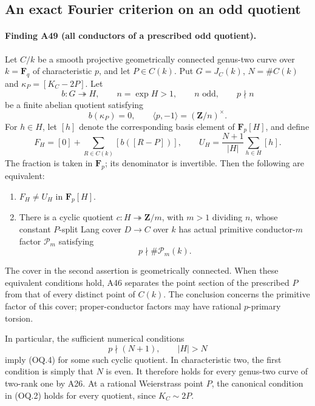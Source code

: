 \subsection{An exact Fourier criterion on an odd quotient}
\label{sec:odd-quotient-fourier}

\paragraph{Finding A49 (all conductors of a prescribed odd quotient).}
Let $C/k$ be a smooth projective geometrically connected genus-two
curve over $k=\mathbf F_q$ of characteristic $p$, and let $P\in C(k)$.
Put $G=J_C(k)$, $N=\#C(k)$ and $\kappa_P=[K_C-2P]$.
Let
\[
 b:G\twoheadrightarrow H,\qquad
 n=\exp H>1,\qquad n\text{ odd},\qquad p\nmid n
 \tag{OQ.1}
\]
be a finite abelian quotient satisfying
\[
 b(\kappa_P)=0,\qquad
       \langle p,-1\rangle=(\mathbf Z/n)^\times.
 \tag{OQ.2}
\]
For $h\in H$, let $[h]$ denote the corresponding basis element of
$\mathbf F_p[H]$, and define
\[
 F_H=[0]+\sum_{R\in C(k)}[b([R-P])],\qquad
 U_H=\frac{N+1}{|H|}\sum_{h\in H}[h].
 \tag{OQ.3}
\]
The fraction is taken in $\mathbf F_p$; its denominator is invertible.
Then the following are equivalent:
\begin{enumerate}
\item $F_H\ne U_H$ in $\mathbf F_p[H]$.
\item There is a cyclic quotient $c:H\twoheadrightarrow\mathbf Z/m$,
      with $m>1$ dividing $n$, whose constant $P$-split Lang cover
      $D\to C$ over $k$ has actual primitive conductor-$m$ factor
      $\mathcal P_m$ satisfying
      \[
                  p\nmid\#\mathcal P_m(k).
       \tag{OQ.4}
      \]
\end{enumerate}
The cover in the second assertion is geometrically connected.
When these equivalent conditions hold, A46 separates the point section of the prescribed $P$
from that of every distinct point of $C(k)$.
The conclusion concerns the primitive factor of this cover;
proper-conductor factors may have rational $p$-primary torsion.

In particular, the sufficient numerical conditions
\[
                 p\nmid(N+1),\qquad |H|>N
 \tag{OQ.5}
\]
imply (OQ.4) for some such cyclic quotient. In characteristic two,
the first condition is simply that $N$ is even. It therefore holds
for every genus-two curve of two-rank one by A26.
At a rational Weierstrass point $P$, the canonical condition in
(OQ.2) holds for every quotient, since $K_C\sim2P$.

